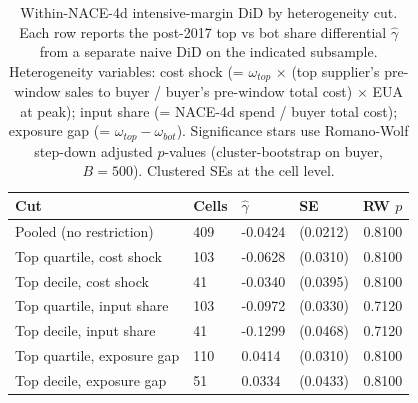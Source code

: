 \begin{table}[ht]
\centering
\caption{Within-NACE-4d intensive-margin DiD by heterogeneity cut.  Each row reports the post-2017 top vs bot share differential $\widehat{\gamma}$ from a separate naive DiD on the indicated subsample. Heterogeneity variables: cost shock (= $\omega_{top}$ $\times$ (top supplier's pre-window sales to buyer / buyer's pre-window total cost) $\times$ EUA at peak); input share (= NACE-4d spend / buyer total cost); exposure gap (= $\omega_{top} - \omega_{bot}$). Significance stars use Romano-Wolf step-down adjusted $p$-values (cluster-bootstrap on buyer, $B = 500$). Clustered SEs at the cell level.} 
\label{tab:phase4_within_intensive_did_mht_heterogeneity}
\begin{tabular}{llllr}
  \toprule
Cut & Cells & $\widehat{\gamma}$ & SE & RW $p$ \\ 
  \midrule
Pooled (no restriction) & 409 & -0.0424 & (0.0212) & 0.8100 \\ 
  Top quartile, cost shock & 103 & -0.0628 & (0.0310) & 0.8100 \\ 
  Top decile, cost shock &  41 & -0.0340 & (0.0395) & 0.8100 \\ 
  Top quartile, input share & 103 & -0.0972 & (0.0330) & 0.7120 \\ 
  Top decile, input share &  41 & -0.1299 & (0.0468) & 0.7120 \\ 
  Top quartile, exposure gap & 110 & 0.0414 & (0.0310) & 0.8100 \\ 
  Top decile, exposure gap &  51 & 0.0334 & (0.0433) & 0.8100 \\ 
   \bottomrule
\end{tabular}
\end{table}
